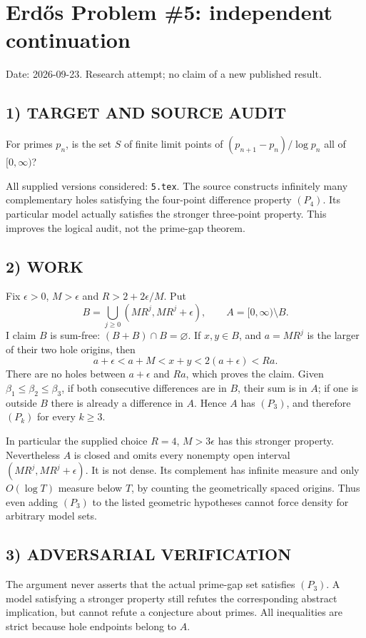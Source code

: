 \section{Erd\H{o}s Problem \#5: independent continuation}
\noindent Date: 2026-09-23. Research attempt; no claim of a new published result.
\subsection{1) TARGET AND SOURCE AUDIT}
For primes $p_n$, is the set $S$ of finite limit points of $(p_{n+1}-p_n)/\log p_n$ all of $[0,\infty)$?

All supplied versions considered: \texttt{5.tex}.
The source constructs infinitely many complementary holes satisfying the four-point difference property $(P_4)$. Its particular model actually satisfies the stronger three-point property. This improves the logical audit, not the prime-gap theorem.
\subsection{2) WORK}
Fix $\epsilon>0$, $M>\epsilon$ and $R>2+2\epsilon/M$. Put
\[
B=\bigcup_{j\ge0}(MR^j,MR^j+\epsilon),\qquad A=[0,\infty)\setminus B.
\]
I claim $B$ is sum-free: $(B+B)\cap B=\varnothing$. If $x,y\in B$, and $a=MR^j$ is the larger of their two hole origins, then
\[
a+\epsilon<a+M<x+y<2(a+\epsilon)<Ra.
\]
There are no holes between $a+\epsilon$ and $Ra$, which proves the claim. Given $\beta_1\le\beta_2\le\beta_3$, if both consecutive differences are in $B$, their sum is in $A$; if one is outside $B$ there is already a difference in $A$. Hence $A$ has $(P_3)$, and therefore $(P_k)$ for every $k\ge3$.

In particular the supplied choice $R=4$, $M>3\epsilon$ has this stronger property. Nevertheless $A$ is closed and omits every nonempty open interval $(MR^j,MR^j+\epsilon)$. It is not dense. Its complement has infinite measure and only $O(\log T)$ measure below $T$, by counting the geometrically spaced origins. Thus even adding $(P_3)$ to the listed geometric hypotheses cannot force density for arbitrary model sets.
\subsection{3) ADVERSARIAL VERIFICATION}
The argument never asserts that the actual prime-gap set satisfies $(P_3)$. A model satisfying a stronger property still refutes the corresponding abstract implication, but cannot refute a conjecture about primes. All inequalities are strict because hole endpoints belong to $A$.
